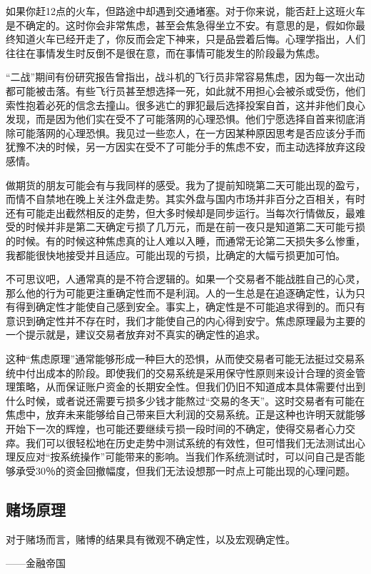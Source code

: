如果你赶12点的火车，但路途中却遇到交通堵塞。对于你来说，能否赶上这班火车是不确定的。这时你会非常焦虑，甚至会焦急得坐立不安。有意思的是，假如你最终知道火车已经开走了，你反而会定下神来，只是品尝着后悔。心理学指出，人们往往在事情发生时反倒不是很在意，而在事情可能发生的阶段最为焦虑。

“二战”期间有份研究报告曾指出，战斗机的飞行员非常容易焦虑，因为每一次出动都可能被击落。有些飞行员甚至想选择一死，如此就不用担心会被杀或受伤，他们索性抱着必死的信念去撞山。很多逃亡的罪犯最后选择投案自首，这并非他们良心发现，而是因为他们实在受不了可能落网的心理恐惧。他们宁愿选择自首来彻底消除可能落网的心理恐惧。我见过一些恋人，在一方因某种原因思考是否应该分手而犹豫不决的时候，另一方因实在受不了可能分手的焦虑不安，而主动选择放弃这段感情。

做期货的朋友可能会有与我同样的感受。我为了提前知晓第二天可能出现的盈亏，而情不自禁地在晚上关注外盘走势。其实外盘与国内市场并非百分之百相关，有时还有可能走出截然相反的走势，但大多时候却是同步运行。当每次行情做反，最难受的时候并非是第二天确定亏损了几万元，而是在前一夜只是知道第二天可能亏损的时候。有的时候这种焦虑真的让人难以入睡，而通常无论第二天损失多么惨重，我都能很快地接受并且适应。可能出现的亏损，比确定的大幅亏损更加可怕。

不可思议吧，人通常真的是不符合逻辑的。如果一个交易者不能战胜自己的心灵，那么他的行为可能更注重确定性而不是利润。人的一生总是在追逐确定性，认为只有得到确定性才能使自己感到安全。事实上，确定性是不可能追求得到的。而只有意识到确定性并不存在时，我们才能使自己的内心得到安宁。焦虑原理最为主要的一个提示就是，建议交易者放弃对不真实的确定性的追求。

这种“焦虑原理”通常能够形成一种巨大的恐惧，从而使交易者可能无法挺过交易系统中付出成本的阶段。即使我们的交易系统是采用保守性原则来设计合理的资金管理策略，从而保证账户资金的长期安全性。但我们仍旧不知道成本具体需要付出到什么时候，或者说还需要亏损多少钱才能熬过“交易的冬天”。这时交易者有可能在焦虑中，放弃未来能够给自己带来巨大利润的交易系统。正是这种也许明天就能够开始下一次的辉煌，也可能还要继续亏损一段时间的不确定，使得交易者心力交瘁。我们可以很轻松地在历史走势中测试系统的有效性，但可惜我们无法测试出心理反应对“按系统操作”可能带来的影响。当我们作系统测试时，可以问自己是否能够承受30％的资金回撤幅度，但我们无法设想那一时点上可能出现的心理问题。

\subsection{赌场原理}

{\kaishu
对于赌场而言，赌博的结果具有微观不确定性，以及宏观确定性。

\hfill ——金融帝国
}

